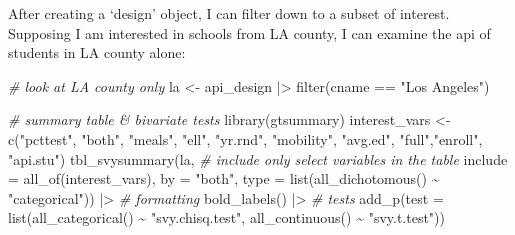 \documentclass[
]{book}
\newenvironment{Shaded}{\begin{snugshade}}{\end{snugshade}}
\newcommand{\AttributeTok}[1]{\textcolor[rgb]{0.77,0.63,0.00}{#1}}
\newcommand{\CommentTok}[1]{\textcolor[rgb]{0.56,0.35,0.01}{\textit{#1}}}
\newcommand{\FunctionTok}[1]{\textcolor[rgb]{0.00,0.00,0.00}{#1}}
\newcommand{\NormalTok}[1]{#1}
\newcommand{\OtherTok}[1]{\textcolor[rgb]{0.56,0.35,0.01}{#1}}
\newcommand{\SpecialCharTok}[1]{\textcolor[rgb]{0.00,0.00,0.00}{#1}}
\newcommand{\StringTok}[1]{\textcolor[rgb]{0.31,0.60,0.02}{#1}}
\begin{document}
After creating a `design' object, I can filter down to a subset of interest. Supposing I am interested in schools from LA county, I can examine the api of students in LA county alone:

\begin{Shaded}
\begin{Highlighting}[]
\CommentTok{\# look at LA county only }
\NormalTok{la }\OtherTok{\textless{}{-}}\NormalTok{ api\_design }\SpecialCharTok{|\textgreater{}} 
  \FunctionTok{filter}\NormalTok{(cname }\SpecialCharTok{==} \StringTok{"Los Angeles"}\NormalTok{)}

\CommentTok{\# summary table \& bivariate tests }
\FunctionTok{library}\NormalTok{(gtsummary)}
\NormalTok{interest\_vars }\OtherTok{\textless{}{-}} \FunctionTok{c}\NormalTok{(}\StringTok{"pcttest"}\NormalTok{, }\StringTok{"both"}\NormalTok{, }\StringTok{"meals"}\NormalTok{, }\StringTok{"ell"}\NormalTok{, }\StringTok{"yr.rnd"}\NormalTok{, }\StringTok{"mobility"}\NormalTok{,}
                   \StringTok{"avg.ed"}\NormalTok{, }\StringTok{"full"}\NormalTok{,}\StringTok{"enroll"}\NormalTok{, }\StringTok{"api.stu"}\NormalTok{)}
\FunctionTok{tbl\_svysummary}\NormalTok{(la, }
               \CommentTok{\# include only select variables in the table}
               \AttributeTok{include =} \FunctionTok{all\_of}\NormalTok{(interest\_vars),}
               \AttributeTok{by =} \StringTok{"both"}\NormalTok{, }
               \AttributeTok{type =} \FunctionTok{list}\NormalTok{(}\FunctionTok{all\_dichotomous}\NormalTok{() }\SpecialCharTok{\textasciitilde{}} \StringTok{"categorical"}\NormalTok{)) }\SpecialCharTok{|\textgreater{}} 
  \CommentTok{\# formatting }
  \FunctionTok{bold\_labels}\NormalTok{() }\SpecialCharTok{|\textgreater{}} 
  \CommentTok{\# tests}
  \FunctionTok{add\_p}\NormalTok{(}\AttributeTok{test =} \FunctionTok{list}\NormalTok{(}\FunctionTok{all\_categorical}\NormalTok{() }\SpecialCharTok{\textasciitilde{}} \StringTok{"svy.chisq.test"}\NormalTok{,}
                    \FunctionTok{all\_continuous}\NormalTok{() }\SpecialCharTok{\textasciitilde{}} \StringTok{"svy.t.test"}\NormalTok{))}
\end{Highlighting}
\end{Shaded}
\end{document}
